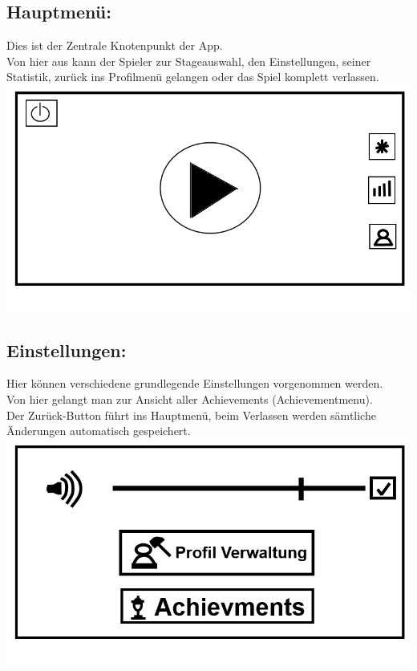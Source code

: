 \documentclass{scrartcl}
\begin{document}
\begin{enumerate}
	\begin{minipage}{1\textwidth}
		\item \subsection*{Hauptmenü:} \label{appaufbau:Hauptmenü}
		Dies ist der Zentrale Knotenpunkt der App.\\
		Von hier aus kann der Spieler zur Stageauswahl, den Einstellungen, seiner Statistik, zurück ins Profilmenü gelangen oder das Spiel komplett verlassen.\\
		\includegraphics[scale=0.5]{assets/Mainmenu}
	\end{minipage}
	
	\begin{minipage}{1\textwidth}
		\item \subsection*{Einstellungen:}
		Hier können verschiedene grundlegende Einstellungen vorgenommen werden.\\
		Von hier gelangt man zur Ansicht aller Achievements (Achievementmenu).\\
		Der Zurück-Button führt ins Hauptmenü, beim Verlassen werden sämtliche Änderungen automatisch gespeichert.\\
		\includegraphics[scale=0.5]{assets/Einstellungen}
	\end{minipage}


\end{enumerate}
\end{document}
